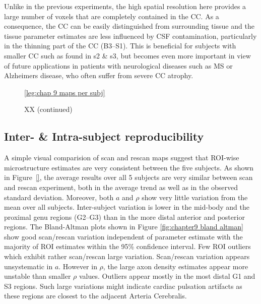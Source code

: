 Unlike in the previous experiments, the high spatial resolution here provides a large number of voxels that are completely contained in the CC. As a consequence, the CC can be easily distinguished from surrounding tissue and the tissue parameter estimates are less influenced by CSF contamination, particularly in the thinning part of the CC (B3--S1). This is beneficial for subjects with smaller CC such as found in s2 \& s3, but becomes even more important in view of future applications in patients with neurological diseases such as MS or Alzheimers disease, who often suffer from severe CC atrophy. 
\begin{figure}[ht]
	\centering
 	\ref{leg:chap 9 maps per subj}
	\caption{XX (continued)}
	\label{fig:chap9 scan rescan maps per subject}
\end{figure}

\subsection*{Inter- \& Intra-subject reproducibility}
A simple visual comparision of scan and rescan maps suggest that ROI-wise microstructure estimates are very consistent between the five subjects. As shown in Figure~\ref{}, the average results over all 5 subjects are very similar between scan and rescan experiment, both in the average trend as well as in the observed standard deviation. Moreover, both $a$ and $\rho$ show very little variation from the mean over all subjects. Inter-subject variation is lower in the mid-body and the proximal genu regions (G2--G3) than in the more distal anterior and posterior regions. The Bland-Altman plots shown in Figure \ref{fig:chapter9 bland altman} show good scan/rescan variation independent of parameter estimate with the majority of ROI estimates within the 95\% confidence interval. Few ROI outliers which exhibit rather scan/rescan large variation. Scan/rescan variation appears unsystematic in $a$. However in $\rho$, the large axon density estimates appear more unstable than smaller $\rho$ values. Outliers appear mostly in the most distal G1 and S3 regions. Such large variations might indicate cardiac pulsation artifacts as these regions are closest to the adjacent Arteria Cerebralis. 


